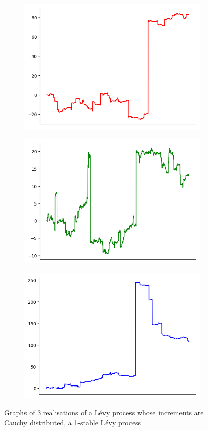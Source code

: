 \begin{figure}[htbp]
	\centering
	\begin{subfigure}{0.3\textwidth}
		\centering
		\includegraphics[width=0.85\linewidth]{pics/ch-brownian/1-cauchyr.png}
	\end{subfigure}%
	\begin{subfigure}{.3\textwidth}
		\centering
		\includegraphics[width=.9\linewidth]{pics/ch-brownian/1-cauchyg.png}
	\end{subfigure}%
	\begin{subfigure}{.3\textwidth}
		\centering
		\includegraphics[width=.9\linewidth]{pics/ch-brownian/1-cauchyb.png}
	\end{subfigure}
	\caption{Graphs of 3 realisations of a L\'evy process whose increments are Cauchy distributed, a 1-stable L\'evy process}
	\label{fig:cauchy}
\end{figure}

